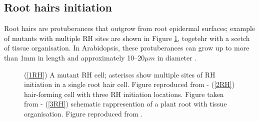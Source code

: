 

\subsection{Root hairs initiation}\label{sec:RH initiation}
Root hairs are protuberances that outgrow from root epidermal surfaces; example of mutants with multiple RH sites are shown in Figure \ref{fig:RH}, togetehr with a scetch of tissue organisation. In Arabidopsis, these protuberances can grow up to more than 1mm in length and approximately 10–20$\mu m$ in diameter \cite{intra1_R:Arabook}.
\begin{figure}[H]
    \centering
    \quad
    \quad
    \caption[Root-hairs initiation]{ (\ref{1RH}) A mutant RH cell; asteriscs show multiple sites of RH initiation in a single root hair cell. Figure reproduced from \cite{phd:120} - (\ref{2RH}) hair-forming cell with three RH initiation locations. Figure taken from \cite{phd:120} - (\ref{3RH}) schematic rappresention of a plant root with tissue organisation. Figure reproduced from \cite{jones}.}
    \label{fig:RH}
\end{figure}

